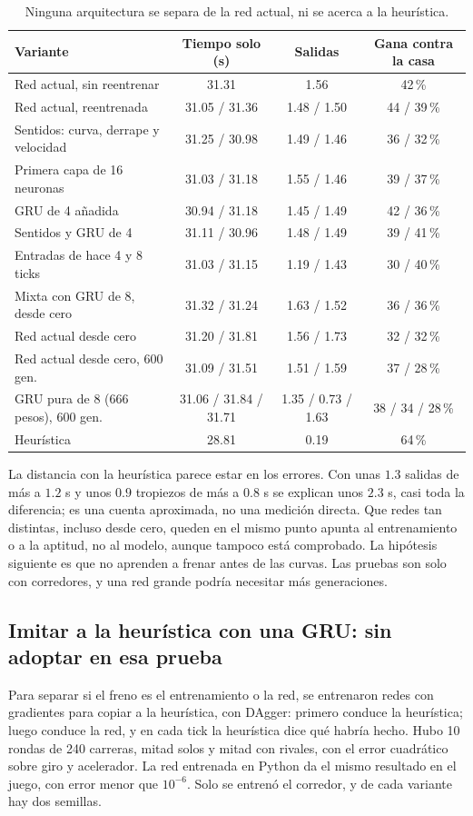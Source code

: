 \documentclass[11pt,letterpaper]{article}
\begin{document}
\begin{table}[h]\centering\small
\begin{tabular}{lccc}
\toprule
Variante & Tiempo solo (s) & Salidas & Gana contra la casa \\
\midrule
Red actual, sin reentrenar & 31.31 & 1.56 & 42\,\% \\
Red actual, reentrenada & 31.05 / 31.36 & 1.48 / 1.50 & 44 / 39\,\% \\
Sentidos: curva, derrape y velocidad & 31.25 / 30.98 & 1.49 / 1.46 & 36 / 32\,\% \\
Primera capa de 16 neuronas & 31.03 / 31.18 & 1.55 / 1.46 & 39 / 37\,\% \\
GRU de 4 añadida & 30.94 / 31.18 & 1.45 / 1.49 & 42 / 36\,\% \\
Sentidos y GRU de 4 & 31.11 / 30.96 & 1.48 / 1.49 & 39 / 41\,\% \\
Entradas de hace 4 y 8 ticks & 31.03 / 31.15 & 1.19 / 1.43 & 30 / 40\,\% \\
Mixta con GRU de 8, desde cero & 31.32 / 31.24 & 1.63 / 1.52 & 36 / 36\,\% \\
Red actual desde cero & 31.20 / 31.81 & 1.56 / 1.73 & 32 / 32\,\% \\
Red actual desde cero, 600 gen. & 31.09 / 31.51 & 1.51 / 1.59 & 37 / 28\,\% \\
GRU pura de 8 (666 pesos), 600 gen. & 31.06 / 31.84 / 31.71 & 1.35 / 0.73 / 1.63 & 38 / 34 / 28\,\% \\
\midrule
Heurística & 28.81 & 0.19 & 64\,\% \\
\bottomrule
\end{tabular}
\caption{Ninguna arquitectura se separa de la red actual, ni se acerca a la heurística.}
\end{table}

La distancia con la heurística parece estar en los errores. Con unas $1.3$ salidas de más a $1.2$ s y unos $0.9$ tropiezos de más a $0.8$ s se explican unos $2.3$ s, casi toda la diferencia; es una cuenta aproximada, no una medición directa. Que redes tan distintas, incluso desde cero, queden en el mismo punto apunta al entrenamiento o a la aptitud, no al modelo, aunque tampoco está comprobado. La hipótesis siguiente es que no aprenden a frenar antes de las curvas. Las pruebas son solo con corredores, y una red grande podría necesitar más generaciones.

\subsection{Imitar a la heurística con una GRU: sin adoptar en esa prueba}
Para separar si el freno es el entrenamiento o la red, se entrenaron redes con gradientes para copiar a la heurística, con DAgger: primero conduce la heurística; luego conduce la red, y en cada tick la heurística dice qué habría hecho. Hubo 10 rondas de 240 carreras, mitad solos y mitad con rivales, con el error cuadrático sobre giro y acelerador. La red entrenada en Python da el mismo resultado en el juego, con error menor que $10^{-6}$. Solo se entrenó el corredor, y de cada variante hay dos semillas.
\end{document}
